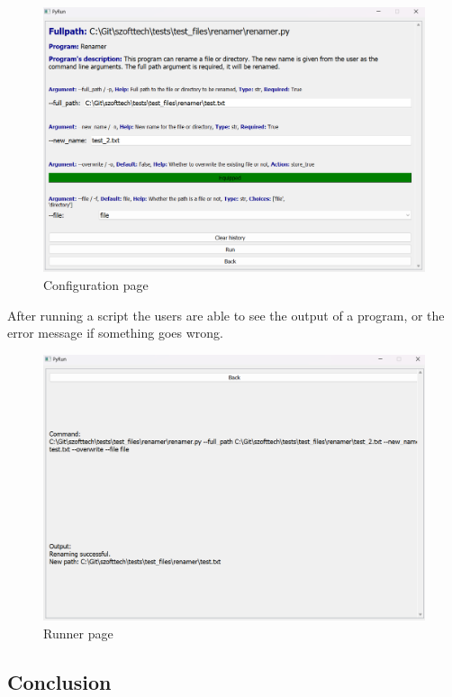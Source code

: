 \documentclass{article}
\begin{document}
\begin{figure}[h]
    \centering
    \includegraphics[width=1\linewidth]{img/config_page.png}
    \caption{Configuration page}
    \label{fig:enter-label}
\end{figure}

\clearpage

After running a script the users are able to see the output of a program, or the error message if something goes wrong.

\begin{figure}[h]
    \centering
    \includegraphics[width=1\linewidth]{img/runner_page.png}
    \caption{Runner page}
    \label{fig:enter-label}
\end{figure}

\subsection{Conclusion}
\end{document}
